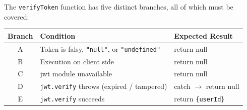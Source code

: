 \documentclass[12pt,a4paper]{report}
\begin{document}
The \texttt{verifyToken} function has five distinct branches, all of which must be covered:

\begin{center}
\begin{tabular}{clp{7cm}}
    \toprule
    \textbf{Branch} & \textbf{Condition} & \textbf{Expected Result} \\
    \midrule
    A & Token is falsy, \texttt{"null"}, or \texttt{"undefined"} & return null \\
    B & Execution on client side & return null \\
    C & jwt module unavailable & return null \\
    D & \texttt{jwt.verify} throws (expired / tampered) & catch $\to$ return null \\
    E & \texttt{jwt.verify} succeeds & return \texttt{\{userId\}} \\
    \bottomrule
\end{tabular}
\end{center}
\end{document}
